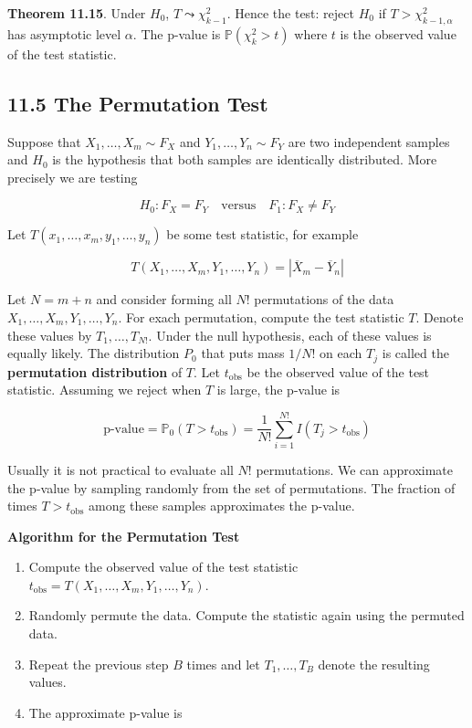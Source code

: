 \textbf{Theorem 11.15}. Under \(H_{0}\), \(T \leadsto \chi^{2}_{k - 1}\).
Hence the test: reject \(H_{0}\) if \(T > \chi^{2}_{k - 1, \alpha}\) has
asymptotic level \(\alpha\). The p-value is \(\mathbb{P}(\chi^{2}_{k} > t)\)
where \(t\) is the observed value of the test statistic.

\subsection*{11.5 The Permutation Test}\label{the-permutation-test}

Suppose that \(X_{1}, \dots, X_m \sim F_X\) and
\(Y_{1}, \dots, Y_{n} \sim F_Y\) are two independent samples and \(H_{0}\) is
the hypothesis that both samples are identically distributed. More
precisely we are testing

\[ H_{0}: F_X = F_Y \quad \text{versus} \quad F_{1}: F_X \neq F_Y\]

Let \(T(x_{1}, \dots, x_m, y_{1}, \dots, y_{n})\) be some test statistic, for
example

\[ T(X_{1}, \dots, X_m, Y_{1}, \dots, Y_{n}) = | \overline{X}_m - \overline{Y}_{n} |\]

Let \(N = m + n\) and consider forming all \(N!\) permutations of the
data \(X_{1}, \dots, X_m, Y_{1}, \dots, Y_{n}\). For exach permutation,
compute the test statistic \(T\). Denote these values by
\(T_{1}, \dots, T_{N!}\). Under the null hypothesis, each of these values
is equally likely. The distribution \(P_{0}\) that puts mass \(1 / N!\) on
each \(T_{j}\) is called the \textbf{permutation distribution} of \(T\).
Let \(t_\text{obs}\) be the observed value of the test statistic.
Assuming we reject when \(T\) is large, the p-value is

\[ \text{p-value} = \mathbb{P}_{0}(T > t_\text{obs}) = \frac{1}{N!} \sum_{i=1}^{N!} I(T_{j} > t_\text{obs}) \]

Usually it is not practical to evaluate all \(N!\) permutations. We can
approximate the p-value by sampling randomly from the set of
permutations. The fraction of times \(T > t_\text{obs}\) among these
samples approximates the p-value.

\textbf{Algorithm for the Permutation Test}

\begin{enumerate}[label={\arabic*.}]
\item
  Compute the observed value of the test statistic
  \(t_\text{obs} = T(X_{1}, \dots, X_m, Y_{1}, \dots, Y_{n})\).
\item
  Randomly permute the data. Compute the statistic again using the
  permuted data.
\item
  Repeat the previous step \(B\) times and let \(T_{1}, \dots, T_B\)
  denote the resulting values.
\item
  The approximate p-value is
\end{enumerate}

